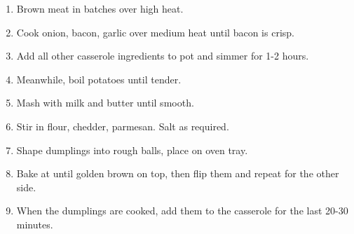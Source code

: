 \begin{enumerate}
    \item Brown meat in batches over high heat.
    \item Cook onion, bacon, garlic over medium heat until bacon is crisp.
    \item Add all other casserole ingredients to pot and simmer for 1-2 hours.
    \item Meanwhile, boil potatoes until tender.
    \item Mash with milk and butter until smooth.
    \item Stir in flour, chedder, parmesan. Salt as required.
    \item Shape dumplings into rough balls, place on oven tray.
    \item Bake at  until golden brown on top, then flip them and repeat for the other side.
    \item When the dumplings are cooked, add them to the casserole for the last 20-30 minutes.
\end{enumerate}
